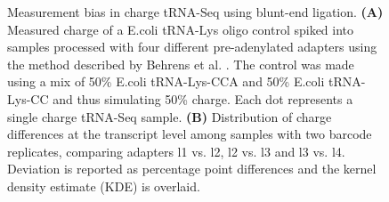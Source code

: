\begin{figure}[ht]
    \centering
    \caption[Measurement bias in charge tRNA-Seq using blunt-end ligation.]{
    Measurement bias in charge tRNA-Seq using blunt-end ligation.
    \textbf{(A)} Measured charge of a E.coli tRNA-Lys oligo control spiked into samples processed with four different pre-adenylated adapters using the method described by Behrens et al. \cite{Behrens2021-gb}.
    The control was made using a mix of 50\% E.coli tRNA-Lys-CCA and 50\% E.coli tRNA-Lys-CC and thus simulating 50\% charge.
    Each dot represents a single charge tRNA-Seq sample.
    \textbf{(B)} Distribution of charge differences at the transcript level among samples with two barcode replicates, comparing adapters l1 vs. l2, l2 vs. l3 and l3 vs. l4.
    Deviation is reported as percentage point differences and the kernel density estimate (KDE) is overlaid.
    }
    \label{ch5:figsupp:f2S2}
\end{figure}


